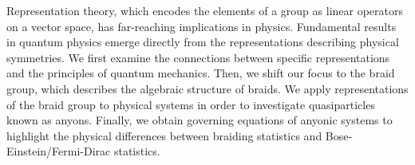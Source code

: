 Representation theory, which encodes the elements of a group as linear operators on a vector space, has far-reaching implications in physics.
Fundamental results in quantum physics emerge directly from the representations describing physical symmetries. We first examine the connections between specific representations and the principles of quantum mechanics. Then, we shift our focus to the braid group, which describes the algebraic structure of braids. We apply representations of the braid group to physical systems in order to investigate quasiparticles known as anyons. Finally, we obtain governing equations of anyonic systems to highlight the physical differences between braiding statistics and Bose-Einstein/Fermi-Dirac statistics.